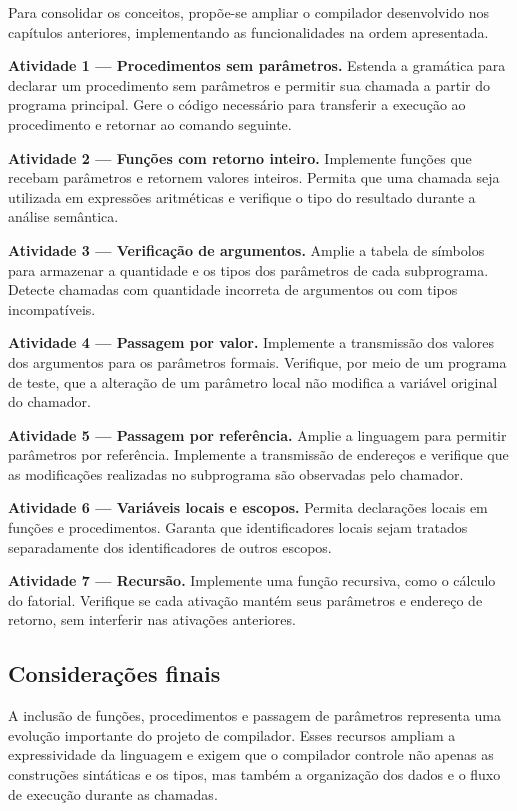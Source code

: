 \documentclass[
  brazilian,
  letterpaper,
]{book}
\theoremstyle{plain}
\theoremstyle{definition}
\theoremstyle{remark}
\begin{document}
Para consolidar os conceitos, propõe-se ampliar o compilador
desenvolvido nos capítulos anteriores, implementando as funcionalidades
na ordem apresentada.

\textbf{Atividade 1 --- Procedimentos sem parâmetros.} Estenda a
gramática para declarar um procedimento sem parâmetros e permitir sua
chamada a partir do programa principal. Gere o código necessário para
transferir a execução ao procedimento e retornar ao comando seguinte.

\textbf{Atividade 2 --- Funções com retorno inteiro.} Implemente funções
que recebam parâmetros e retornem valores inteiros. Permita que uma
chamada seja utilizada em expressões aritméticas e verifique o tipo do
resultado durante a análise semântica.

\textbf{Atividade 3 --- Verificação de argumentos.} Amplie a tabela de
símbolos para armazenar a quantidade e os tipos dos parâmetros de cada
subprograma. Detecte chamadas com quantidade incorreta de argumentos ou
com tipos incompatíveis.

\textbf{Atividade 4 --- Passagem por valor.} Implemente a transmissão
dos valores dos argumentos para os parâmetros formais. Verifique, por
meio de um programa de teste, que a alteração de um parâmetro local não
modifica a variável original do chamador.

\textbf{Atividade 5 --- Passagem por referência.} Amplie a linguagem
para permitir parâmetros por referência. Implemente a transmissão de
endereços e verifique que as modificações realizadas no subprograma são
observadas pelo chamador.

\textbf{Atividade 6 --- Variáveis locais e escopos.} Permita declarações
locais em funções e procedimentos. Garanta que identificadores locais
sejam tratados separadamente dos identificadores de outros escopos.

\textbf{Atividade 7 --- Recursão.} Implemente uma função recursiva, como
o cálculo do fatorial. Verifique se cada ativação mantém seus parâmetros
e endereço de retorno, sem interferir nas ativações anteriores.

\subsection{Considerações finais}\label{considerauxe7uxf5es-finais-2}

A inclusão de funções, procedimentos e passagem de parâmetros representa
uma evolução importante do projeto de compilador. Esses recursos ampliam
a expressividade da linguagem e exigem que o compilador controle não
apenas as construções sintáticas e os tipos, mas também a organização
dos dados e o fluxo de execução durante as chamadas.
\end{document}
